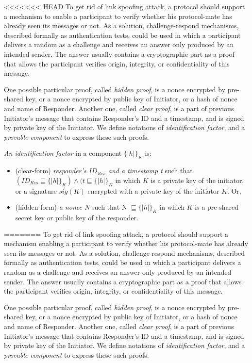 \begin{flushleft}
\begin{flushleft}
\begin{Definition}
\begin{itemize}
<<<<<<< HEAD
To get rid of link spoofing attack, a protocol should support a mechanism to enable a participant to verify whether his protocol-mate has already seen its messages or not. As a solution, challenge-respond mechanisms, described formally as authentication tests, could be used in which a participant delivers a random as a challenge and receives an answer only produced by an intended sender. The answer usually contains a cryptographic part as a proof that allows the participant verifies origin, integrity, or confidentiality of this message. 

One possible particular proof, called \textit{hidden proof}, is a nonce encrypted by pre-shared key, or a nonce encrypted by public key of Initiator, or a hash of nonce and name of Responder. Another one, called \textit{clear proof}, is a part of previous Initiator's message that contains Responder's ID and a timestamp, and is signed by private key of the Initiator. We define notations of \emph{identification factor}, and a \emph{provable component} to express these such proofs. 

\begin{Definition} \emph{An identification factor} in a component $\{|h|\}_K$ is:
\begin{itemize}
	\item(clear-form) \emph{responder's $ID_{Res}$ and a timestamp t} such that $(ID_{Res} \sqsubseteq \{|h|\}_K ) \wedge (t \sqsubseteq \{|h|\}_K$ in which $K$ is a private key of the initiator, or a signature $sig(K)$ encrypted with a private key of the initiator $K$. Or, 
	\item(hidden-form) \emph{a nonce N} such that N $\sqsubseteq \{|h|\}_K$ in which $K$ is a pre-shared secret key or public key of the responder.\end{itemize}
=======
To get rid of link spoofing attack, a protocol should support a mechanism enabling a participant to verify whether his protocol-mate has already seen its messages or not. As a solution, challenge-respond mechanisms, described formally as authentication tests, could be used in which a participant delivers a random as a challenge and receives an answer only produced by an intended sender. The answer usually contains a cryptographic part as a proof that allows the participant verifies origin, integrity, or confidentiality of this message. 

One possible particular proof, called \textit{hidden proof}, is a nonce encrypted by pre-shared key, or a nonce encrypted by public key of Initiator, or a hash of nonce and name of Responder. Another one, called \textit{clear proof}, is a part of previous Initiator's message that contains Responder's ID and a timestamp, and is signed by private key of the Initiator. We define notations of \emph{identification factor}, and a \emph{provable component} to express these such proofs. 


\end{Definition}
\end{itemize}
\end{Definition}
\end{flushleft}
\end{flushleft}
